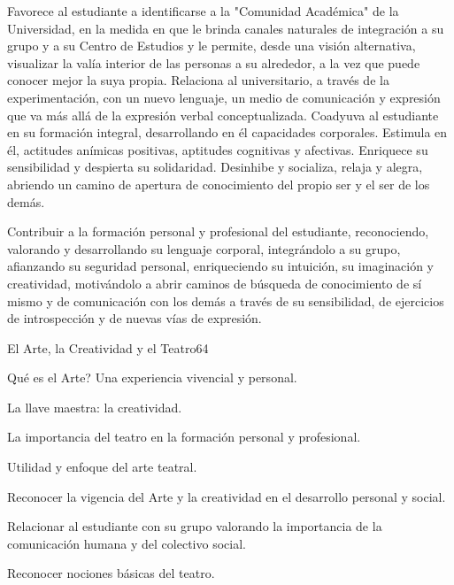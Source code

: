 \begin{syllabus}


\begin{justification}
Favorece al estudiante a identificarse a la "Comunidad Académica" de la Universidad, en la medida en que le brinda canales naturales de integración a su grupo y  a su Centro de Estudios y le permite,  desde una visión alternativa, visualizar la valía interior de las personas a su alrededor, a la vez que puede conocer mejor la suya propia. 
Relaciona al universitario, a través de la experimentación, con un nuevo lenguaje, un medio de comunicación y expresión que va más allá de la expresión verbal conceptualizada.
Coadyuva al estudiante en su formación integral, desarrollando en él  capacidades corporales. Estimula en él, actitudes anímicas positivas,  aptitudes cognitivas y afectivas. Enriquece su sensibilidad y despierta su solidaridad.    
Desinhibe y socializa, relaja y alegra,  abriendo un camino de apertura de conocimiento del propio ser y el ser de los demás.

\end{justification}

\begin{goals}
\item Contribuir a la formación personal y profesional del estudiante, reconociendo, valorando y desarrollando su lenguaje corporal, integrándolo a su grupo, afianzando su seguridad personal, enriqueciendo su intuición, su imaginación y creatividad, motivándolo  a abrir caminos de búsqueda  de conocimiento de sí mismo y de comunicación con los demás a través de su sensibilidad, de ejercicios de introspección y de nuevas vías de expresión.   
\end{goals}

\begin{outcomes}
\end{outcomes}

\begin{unit}{El Arte, la Creatividad y el Teatro}{}{6}{4}
\begin{topics}
	\item Qué es el Arte? Una experiencia vivencial y personal.
	\item La llave maestra: la creatividad.
	\item La importancia del teatro en la formación personal y profesional.
	\item Utilidad y enfoque del arte teatral.
\end{topics}
\begin{learningoutcomes}
	\item Reconocer la vigencia del Arte y la creatividad en el desarrollo personal y social.
	\item Relacionar al estudiante con su grupo valorando la importancia de la comunicación humana y del colectivo  social.
	\item Reconocer nociones  básicas del teatro. 
\end{learningoutcomes}
\end{unit}


\end{syllabus}
